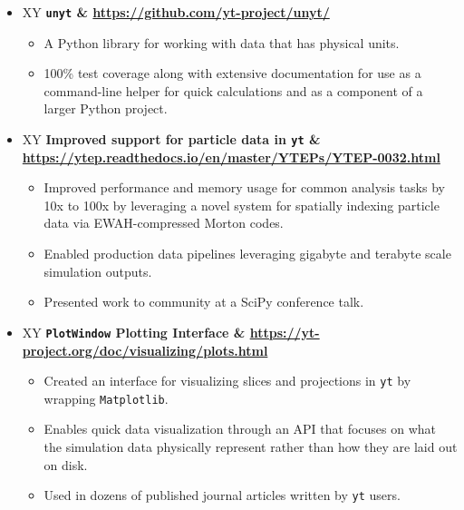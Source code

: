 \documentclass[10pt,letterpaper]{article}
\newcommand{\textline}[2]{
  \begin{tabularx}{\textwidth}{XY}
  #1 & #2
  \end{tabularx}
}
\begin{document}
\begin{itemize}

  \item[] \textline{\bf
    \texttt{unyt}}{\href{https://github.com/yt-project/unyt/}{\small https://github.com/yt-project/unyt/}}
    \begin{itemize}
      \item A Python library for working with data that has physical
        units.
      \item 100\% test coverage along with extensive documentation for use as a
        command-line helper for quick calculations and as a component of a
        larger Python project.
    \end{itemize}
  \item[] \textline{\bf Improved support for particle data in
    \texttt{yt}}{\scriptsize \href{https://ytep.readthedocs.io/en/master/YTEPs/YTEP-0032.html}{https://ytep.readthedocs.io/en/master/YTEPs/YTEP-0032.html}}
    \begin{itemize}
      \item Improved performance and memory usage for common analysis tasks by
        10x to 100x by leveraging a novel system for spatially indexing particle
        data via EWAH-compressed Morton codes.
      \item Enabled production data pipelines leveraging gigabyte and
        terabyte scale simulation outputs.
      \item Presented work to community at a SciPy conference talk.
    \end{itemize}
  \item[] \textline{\bf\texttt{PlotWindow} Plotting Interface}{\href{https://yt-project.org/doc/visualizing/plots.html}{https://yt-project.org/doc/visualizing/plots.html}}
    \begin{itemize}
      \item Created an interface for visualizing slices and projections in
        \texttt{yt} by wrapping \texttt{Matplotlib}.
      \item Enables quick data visualization through an API that
        focuses on what the simulation data physically represent rather than how
        they are laid out on disk.
      \item Used in dozens of published journal articles
        written by \texttt{yt} users.
    \end{itemize}

\end{itemize}
\end{document}
